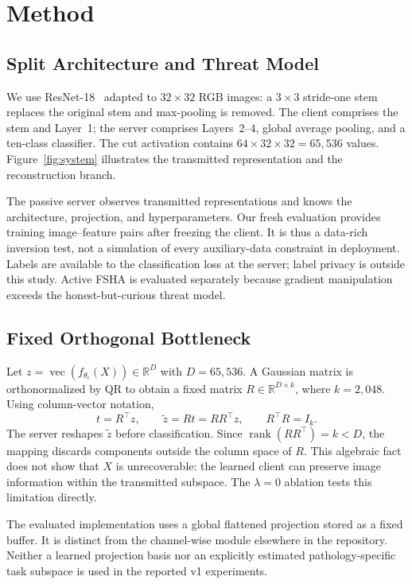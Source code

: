 \section{Method}
\subsection{Split Architecture and Threat Model}
We use ResNet-18~\cite{he2016resnet} adapted to $32\times32$ RGB images: a $3\times3$ stride-one stem replaces the original stem and max-pooling is removed. The client comprises the stem and Layer~1; the server comprises Layers~2--4, global average pooling, and a ten-class classifier. The cut activation contains $64\times32\times32=65{,}536$ values. Figure~\ref{fig:system} illustrates the transmitted representation and the reconstruction branch.

The passive server observes transmitted representations and knows the architecture, projection, and hyperparameters. Our fresh evaluation provides training image--feature pairs after freezing the client. It is thus a data-rich inversion test, not a simulation of every auxiliary-data constraint in deployment. Labels are available to the classification loss at the server; label privacy is outside this study. Active FSHA is evaluated separately because gradient manipulation exceeds the honest-but-curious threat model.



\subsection{Fixed Orthogonal Bottleneck}
Let $z=\operatorname{vec}(f_{\theta_c}(X))\in\mathbb{R}^{D}$ with $D=65{,}536$. A Gaussian matrix is orthonormalized by QR to obtain a fixed matrix $R\in\mathbb{R}^{D\times k}$, where $k=2{,}048$. Using column-vector notation,
\begin{equation}
 t=R^\top z,\qquad \widetilde z=Rt=RR^\top z,\qquad R^\top R=I_k.
 \label{eq:projection}
\end{equation}
The server reshapes $\widetilde z$ before classification. Since $\operatorname{rank}(RR^\top)=k<D$, the mapping discards components outside the column space of $R$. This algebraic fact does not show that $X$ is unrecoverable: the learned client can preserve image information within the transmitted subspace. The $\lambda=0$ ablation tests this limitation directly.

The evaluated implementation uses a global flattened projection stored as a fixed buffer. It is distinct from the channel-wise module elsewhere in the repository. Neither a learned projection basis nor an explicitly estimated pathology-specific task subspace is used in the reported v1 experiments.

